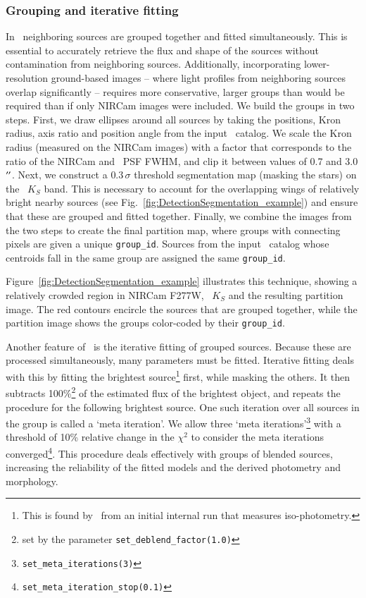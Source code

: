 \documentclass[longauth]{aa}
\begin{document}
\subsubsection{Grouping and iterative fitting} %
In \SEpp\, neighboring sources are grouped together and fitted simultaneously. This is essential to accurately retrieve the flux and shape of the sources without contamination from neighboring sources. Additionally, incorporating lower-resolution ground-based images -- where light profiles from neighboring sources overlap significantly -- requires more conservative, larger groups than would be required than if only NIRCam images were included. We build the groups in two steps. First, we draw ellipses around all sources by taking the positions, Kron radius, axis ratio and position angle from the input \hotcold\ catalog. We scale the Kron radius (measured on the NIRCam images) with a factor that corresponds to the ratio of the NIRCam and \UVISTA\ PSF FWHM, and clip it between values of 0.7 and 3.0 $\SI{}{\ensuremath{^{\prime\prime}}}$. Next, we construct a $0.3\,\sigma$ threshold segmentation map (masking the stars) on the \UVISTA\ $K_{S}$ band. This is necessary to account for the overlapping wings of relatively bright nearby sources (see Fig.~\ref{fig:DetectionSegmentation_example}) and ensure that these are grouped and fitted together. Finally, we combine the images from the two steps to create the final partition map, where groups with connecting pixels are given a unique \texttt{group\_id}. Sources from the input \hotcold\ catalog whose centroids fall in the same group are assigned the same \texttt{group\_id}. 

Figure~\ref{fig:DetectionSegmentation_example} illustrates this technique, showing a relatively crowded region in NIRCam F277W, \UVISTA\ $K_{S}$ and the resulting partition image. The red contours encircle the sources that are grouped together, while the partition image shows the groups color-coded by their \texttt{group\_id}.

Another feature of \SEpp\ is the iterative fitting of grouped sources. Because these are processed simultaneously, many parameters must be fitted. Iterative fitting deals with this by fitting the brightest source\footnote{This is found by \SEpp\ from an initial internal run that measures iso-photometry.} first, while masking the others. It then subtracts 100\%\footnote{set by the parameter \texttt{set\_deblend\_factor(1.0)}} of the estimated flux of the brightest object, and repeats the procedure for the following brightest source. One such iteration over all sources in the group is called a `meta iteration'. We allow three `meta iterations'\footnote{\texttt{set\_meta\_iterations(3)}} with a threshold of 10\% relative change in the $\chi^2$ to consider the meta iterations converged\footnote{\texttt{set\_meta\_iteration\_stop(0.1)}}. This procedure deals effectively with groups of blended sources, increasing the reliability of the fitted models and the derived photometry and morphology.
\end{document}
